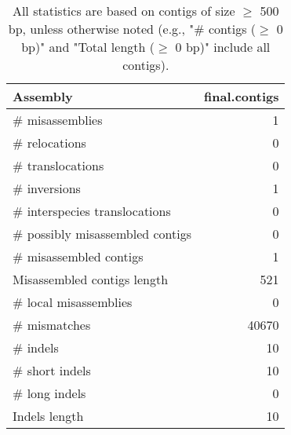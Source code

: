 \documentclass[12pt,a4paper]{article}
\begin{document}
\begin{table}[ht]
\begin{center}
\caption{All statistics are based on contigs of size $\geq$ 500 bp, unless otherwise noted (e.g., "\# contigs ($\geq$ 0 bp)" and "Total length ($\geq$ 0 bp)" include all contigs).}
\begin{tabular}{|l*{1}{|r}|}
\hline
Assembly & final.contigs \\ \hline
\# misassemblies & 1 \\ \hline
\hspace{5mm}\# relocations & 0 \\ \hline
\hspace{5mm}\# translocations & 0 \\ \hline
\hspace{5mm}\# inversions & 1 \\ \hline
\hspace{5mm}\# interspecies translocations & 0 \\ \hline
\# possibly misassembled contigs & 0 \\ \hline
\# misassembled contigs & 1 \\ \hline
Misassembled contigs length & 521 \\ \hline
\# local misassemblies & 0 \\ \hline
\# mismatches & 40670 \\ \hline
\# indels & 10 \\ \hline
\hspace{5mm}\# short indels & 10 \\ \hline
\hspace{5mm}\# long indels & 0 \\ \hline
Indels length & 10 \\ \hline
\end{tabular}
\end{center}
\end{table}
\end{document}
